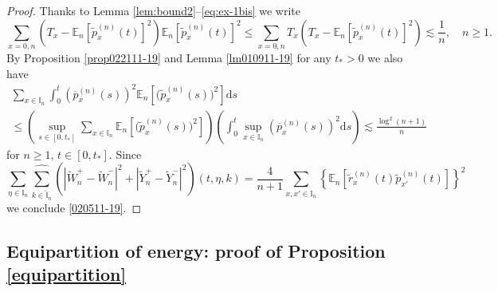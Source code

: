 \documentclass[EJP]{ejpecp} %
\newcommand\E{{\mathbb E}}
\newcommand\T{{\mathbb I}}
\renewcommand{\ge}{\geqslant}
\renewcommand{\le}{\leqslant}
\newcommand{\dd  }{\mathrm{d}}
\renewcommand{\hat}{\widehat}
\renewcommand{\tilde}{\widetilde}
\renewcommand{\bar}{\overline}
\numberwithin{equation}{section}
\begin{document}
\begin{proof}
Thanks to Lemma \ref{lem:bound2}--\eqref{eq:ex-1bis} we  write
\begin{equation*}
\sum_{x=0,n}\left(T_x-\E_n\left[\tilde p_x^{(n)}(t)\right]^2\right)\E_n\left[\tilde p_x^{(n)}(t)\right]^2 \le
\sum_{x=0,n}T_x\left(T_x-\E_n\left[\tilde p_x^{(n)}(t)\right]^2\right)\lesssim
\frac{1}{n},\quad n\ge1.
\end{equation*}
By Proposition \ref{prop022111-19} and  Lemma \ref{lm010911-19} for any
$t_*>0$ we also
have
\begin{multline}
\label{020602-20}
\sum_{x\in\T_n}\int_0^t\left(\bar p_x^{(n)}(s)\right)^2\E_n\left[\big(\tilde
  p_x^{(n)}(s)\big)^2\right]\dd s\\
\le
\left(\sup_{s\in[0,t_*]}\sum_{x\in\T_n}\E_n\left[\big(\tilde p_x^{(n)}(s)\big)^2\right]\right)
\left(\int_0^t \sup_{x\in\T_n} \left(\bar p_x^{(n)}(s)\right)^2\dd s\right)\lesssim\frac{\log^2(n+1)}{n}
\end{multline}
for $n\ge1$, $t\in[0,t_*]$.
Since 
\begin{equation*}
\sum_{\eta\in\T_n}\underset{{k\in \widehat{\T}_n}}{{\hat\sum}}\left(\left|\tilde W^+_n -\tilde W^-_n \right|^2+\left|\tilde Y^+_n -\tilde Y^-_n
  \right|^2\right) (t,\eta,k)=\frac {4}{n+1} 
  \sum_{x,x'\in \T_n}
\left\{\mathbb E_n\left[  \tilde r_{x}^{(n)}(t) \tilde p_{x'}^{(n)}(t)\right]\right\}^2
\end{equation*}
we conclude   \eqref{020511-19}.
\end{proof}





\subsection{Equipartition of energy: proof
of Proposition \ref{equipartition}}


\label{sec11}
\end{document}
